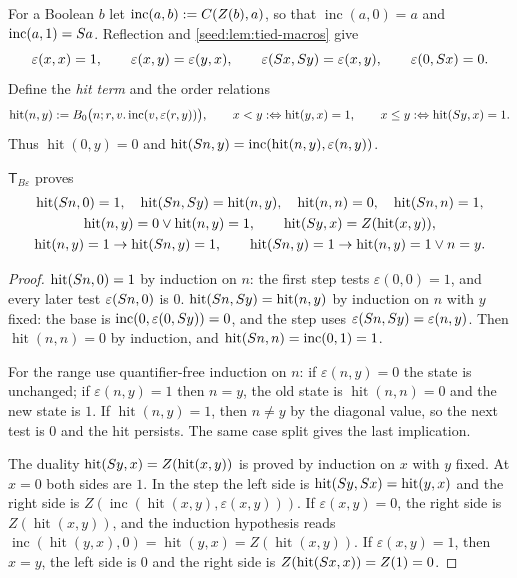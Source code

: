 For a Boolean $b$ let $\operatorname{inc}(a,b)\mathrel{:=} C(Z(b),a)$, so that
$\operatorname{inc}(a,0)=a$ and $\operatorname{inc}(a,1)=S a$. Reflection
and \cref{seed:lem:tied-macros} give
\[
 \varepsilon(x,x)=1,\qquad\varepsilon(x,y)=\varepsilon(y,x),\qquad
 \varepsilon(S x,S y)=\varepsilon(x,y),\qquad\varepsilon(0,S x)=0 .
\]
Define the \emph{hit term} and the order relations
\[
 \operatorname{hit}(n,y)\mathrel{:=}
 B_0\bigl(n;r,v.\operatorname{inc}(v,\varepsilon(r,y))\bigr),\qquad
 x<y\mathrel{:\Leftrightarrow}\operatorname{hit}(y,x)=1,\qquad
 x\leq y\mathrel{:\Leftrightarrow}\operatorname{hit}(S y,x)=1 .
\]
Thus $\operatorname{hit}(0,y)=0$ and
$\operatorname{hit}(S n,y)
=\operatorname{inc}(\operatorname{hit}(n,y),\varepsilon(n,y))$.

\begin{lemma}\label{seed:lem:tbe-hit}
$\mathsf{T}_{B\varepsilon}$ proves
\begin{gather*}
 \operatorname{hit}(S n,0)=1,\quad
 \operatorname{hit}(S n,S y)=\operatorname{hit}(n,y),\quad
 \operatorname{hit}(n,n)=0,\quad\operatorname{hit}(S n,n)=1,\\
 \operatorname{hit}(n,y)=0\lor\operatorname{hit}(n,y)=1,\qquad
 \operatorname{hit}(S y,x)=Z(\operatorname{hit}(x,y)),\\
 \operatorname{hit}(n,y)=1\to\operatorname{hit}(S n,y)=1,\qquad
 \operatorname{hit}(S n,y)=1\to\operatorname{hit}(n,y)=1\lor n=y .
\end{gather*}
\end{lemma}

\begin{proof}
$\operatorname{hit}(S n,0)=1$ by induction on $n$: the first step tests
$\varepsilon(0,0)=1$, and every later test $\varepsilon(S n,0)$ is $0$.
$\operatorname{hit}(S n,S y)=\operatorname{hit}(n,y)$ by induction on
$n$ with $y$ fixed: the base is
$\operatorname{inc}(0,\varepsilon(0,S y))=0$, and the step uses
$\varepsilon(S n,S y)=\varepsilon(n,y)$. Then
$\operatorname{hit}(n,n)=0$ by induction, and
$\operatorname{hit}(S n,n)=\operatorname{inc}(0,1)=1$.

For the range use quantifier-free induction on $n$: if
$\varepsilon(n,y)=0$ the state is unchanged; if $\varepsilon(n,y)=1$ then
$n=y$, the old state is $\operatorname{hit}(n,n)=0$ and the new state is
$1$. If $\operatorname{hit}(n,y)=1$, then $n\neq y$ by the diagonal value,
so the next test is $0$ and the hit persists. The same case split gives the
last implication.

The duality $\operatorname{hit}(S y,x)=Z(\operatorname{hit}(x,y))$ is
proved by induction on $x$ with $y$ fixed. At $x=0$ both sides are $1$. In
the step the left side is
$\operatorname{hit}(S y,S x)=\operatorname{hit}(y,x)$ and the right
side is $Z(\operatorname{inc}(\operatorname{hit}(x,y),\varepsilon(x,y)))$.
If $\varepsilon(x,y)=0$, the right side is $Z(\operatorname{hit}(x,y))$, and
the induction hypothesis reads
$\operatorname{inc}(\operatorname{hit}(y,x),0)=\operatorname{hit}(y,x)
=Z(\operatorname{hit}(x,y))$. If $\varepsilon(x,y)=1$, then $x=y$, the left
side is $0$ and the right side is $Z(\operatorname{hit}(S x,x))=Z(1)=0$.
\end{proof}

